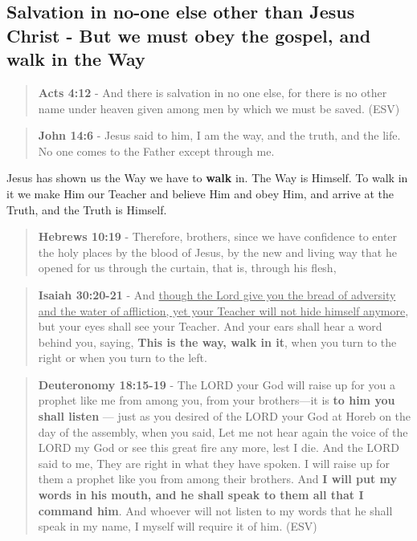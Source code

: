 \documentclass[11pt]{article}
\begin{document}
\subsection{Salvation in no-one else other than Jesus Christ - But we must obey the gospel, and walk in the Way}
\label{sec:org5a911d1}
\begin{quote}
\textbf{Acts 4:12} - And there is salvation in no one else, for there is no other name under heaven given among men by which we must be saved. (ESV)
\end{quote}

\begin{quote}
\textbf{John 14:6} - Jesus said to him, I am the way, and the truth, and the life. No one comes to the Father except through me.
\end{quote}

Jesus has shown us the Way we have to \textbf{walk} in. The Way is Himself. To walk in it we make Him our Teacher and believe Him and obey Him, and arrive at the Truth, and the Truth is Himself.

\begin{quote}
\textbf{Hebrews 10:19} - Therefore, brothers, since we have confidence to enter the holy places by the blood of Jesus, by the new and living way that he opened for us through the curtain, that is, through his flesh,
\end{quote}

\begin{quote}
\textbf{Isaiah 30:20-21} - And \uline{though the Lord give you the bread of adversity and the water of affliction, yet your Teacher will not hide himself anymore}, but your eyes shall see your Teacher. And your ears shall hear a word behind you, saying, \textbf{This is the way, walk in it}, when you turn to the right or when you turn to the left.
\end{quote}

\begin{quote}
\textbf{Deuteronomy 18:15-19} - The LORD your God will raise up for you a prophet like me from among you, from your brothers—it is \textbf{to him you shall listen} — just as you desired of the LORD your God at Horeb on the day of the assembly, when you said, Let me not hear again the voice of the LORD my God or see this great fire any more, lest I die. And the LORD said to me, They are right in what they have spoken. I will raise up for them a prophet like you from among their brothers. And \textbf{I will put my words in his mouth, and he shall speak to them all that I command him}. And whoever will not listen to my words that he shall speak in my name, I myself will require it of him. (ESV)
\end{quote}
\end{document}
